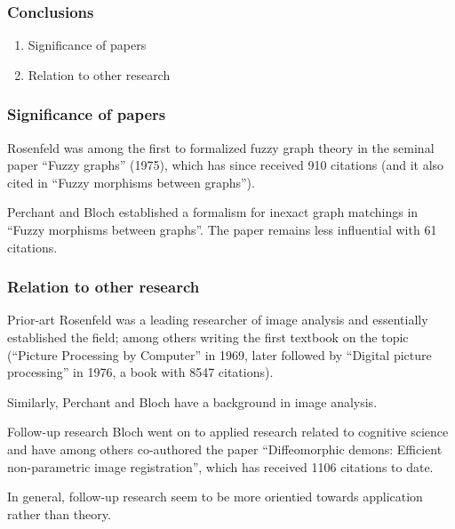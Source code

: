 
\begin{frame}
	\frametitle{Conclusions}

	\begin{enumerate}
		\item Significance of papers
		\item Relation to other research
	\end{enumerate}
\end{frame}


\begin{frame}
	\frametitle{Significance of papers}

	Rosenfeld was among the first to formalized fuzzy graph theory in the seminal paper ``Fuzzy graphs'' (1975), which has since received 910 citations (and it also cited in ``Fuzzy morphisms between graphs'').

	\vspace*{2em}

	Perchant and Bloch established a formalism for inexact graph matchings in ``Fuzzy morphisms between graphs''. The paper remains less influential with 61 citations.
\end{frame}



\begin{frame}
	\frametitle{Relation to other research}

%

	\begin{block}{Prior-art}
		Rosenfeld was a leading researcher of image analysis and essentially established the field; among others writing the first textbook on the topic (``Picture Processing by Computer'' in 1969, later followed by ``Digital picture processing'' in 1976, a book with 8547 citations).

		\vspace*{2em}

		Similarly, Perchant and Bloch have a background in image analysis.
	\end{block}

	\begin{block}{Follow-up research}
		Bloch went on to applied research related to cognitive science and have among others co-authored the paper ``Diffeomorphic demons: Efficient non-parametric image registration'', which has received 1106 citations to date.

		\vspace*{2em}

		In general, follow-up research seem to be more orientied towards application rather than theory.
	\end{block}
\end{frame}
